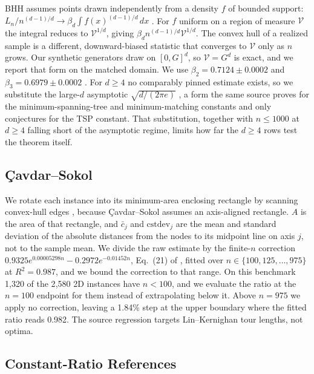 \documentclass{article}
\begin{document}
BHH assumes points drawn independently from a density $f$ of bounded support: $L_n/n^{(d-1)/d}\to\beta_d\int f(x)^{(d-1)/d}\,dx$ \citep{bhh1959}. For $f$ uniform on a region of measure $\mathcal{V}$ the integral reduces to $\mathcal{V}^{1/d}$, giving $\beta_d n^{(d-1)/d}\mathcal{V}^{1/d}$. The convex hull of a realized sample is a different, downward-biased statistic that converges to $\mathcal{V}$ only as $n$ grows. Our synthetic generators draw on $[0,G]^d$, so $\mathcal{V}=G^d$ is exact, and we report that form on the matched domain. We use $\beta_2=0.7124\pm0.0002$ \citep{johnson1996asymptotic} and $\beta_3=0.6979\pm0.0002$ \citep{percus1996finite}. For $d\ge4$ no comparably pinned estimate exists, so we substitute the large-$d$ asymptotic $\sqrt{d/(2\pi e)}$ \citep{bertsimas1990asymptotic}, a form the same source proves for the minimum-spanning-tree and minimum-matching constants and only conjectures for the TSP constant. That substitution, together with $n\le1000$ at $d\ge4$ falling short of the asymptotic regime, limits how far the $d\ge4$ rows test the theorem itself.

\subsection{\c{C}avdar--Sokol}

We rotate each instance into its minimum-area enclosing rectangle by scanning convex-hull edges \citep{freeman1975determining}, because \c{C}avdar--Sokol assumes an axis-aligned rectangle. $A$ is the area of that rectangle, and $\bar c_j$ and $\mathrm{cstdev}_j$ are the mean and standard deviation of the absolute distances from the nodes to its midpoint line on axis $j$, not to the sample mean. We divide the raw estimate by the finite-$n$ correction $0.9325e^{0.00005298n}-0.2972e^{-0.01452n}$, Eq.~(21) of \citet{cavdar2014dissertation}, fitted over $n\in\{100,125,\dots,975\}$ at $R^2=0.987$, and we bound the correction to that range. On this benchmark 1{,}320 of the 2{,}580 2D instances have $n<100$, and we evaluate the ratio at the $n=100$ endpoint for them instead of extrapolating below it. Above $n=975$ we apply no correction, leaving a 1.84\% step at the upper boundary where the fitted ratio reads 0.982. The source regression targets Lin--Kernighan tour lengths, not optima.

\subsection{Constant-Ratio References}
\end{document}
